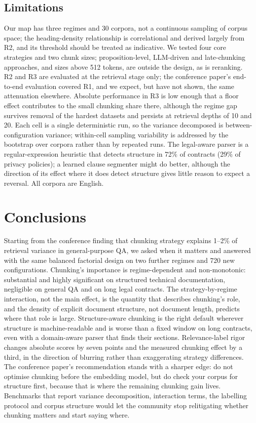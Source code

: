 \documentclass[runningheads]{llncs}
\begin{document}
\subsection{Limitations}
Our map has three regimes and 30 corpora, not a continuous sampling of corpus space; the heading-density relationship is correlational and derived largely from R2, and its threshold should be treated as indicative. We tested four core strategies and two chunk sizes; proposition-level, LLM-driven and late-chunking approaches, and sizes above 512 tokens, are outside the design, as is reranking. R2 and R3 are evaluated at the retrieval stage only; the conference paper's end-to-end evaluation covered R1, and we expect, but have not shown, the same attenuation elsewhere. Absolute performance in R3 is low enough that a floor effect contributes to the small chunking share there, although the regime gap survives removal of the hardest datasets and persists at retrieval depths of 10 and 20. Each cell is a single deterministic run, so the variance decomposed is between-configuration variance; within-cell sampling variability is addressed by the bootstrap over corpora rather than by repeated runs. The legal-aware parser is a regular-expression heuristic that detects structure in 72\% of contracts (29\% of privacy policies); a learned clause segmenter might do better, although the direction of its effect where it does detect structure gives little reason to expect a reversal. All corpora are English.

\section{Conclusions}
\label{sec:conclusions}
Starting from the conference finding that chunking strategy explains 1--2\% of retrieval variance in general-purpose QA, we asked when it matters and answered with the same balanced factorial design on two further regimes and 720 new configurations. Chunking's importance is regime-dependent and non-monotonic: substantial and highly significant on structured technical documentation, negligible on general QA and on long legal contracts. The strategy-by-regime interaction, not the main effect, is the quantity that describes chunking's role, and the density of explicit document structure, not document length, predicts where that role is large. Structure-aware chunking is the right default wherever structure is machine-readable and is worse than a fixed window on long contracts, even with a domain-aware parser that finds their sections. Relevance-label rigor changes absolute scores by seven points and the measured chunking effect by a third, in the direction of blurring rather than exaggerating strategy differences. The conference paper's recommendation stands with a sharper edge: do not optimise chunking before the embedding model, but do check your corpus for structure first, because that is where the remaining chunking gain lives. Benchmarks that report variance decomposition, interaction terms, the labelling protocol and corpus structure would let the community stop relitigating whether chunking matters and start saying where.
\end{document}
